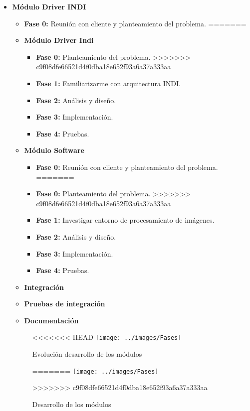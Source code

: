 \begin{itemize}
\begin{itemize}
\begin{itemize}
	\item \textbf{Módulo Driver INDI}
	\begin{itemize}
		\item \textbf{Fase 0:} Reunión con cliente y planteamiento del problema.
=======
	
	\item \textbf{Módulo Driver Indi}
	\begin{itemize}
		\item \textbf{Fase 0:} Planteamiento del problema.
>>>>>>> c9f08dfe66521d4f0dba18e652f93a6a37a333aa
		\item \textbf{Fase 1:} Familiarizarme con arquitectura INDI.
		\item \textbf{Fase 2:} Análisis y diseño.
		\item \textbf{Fase 3:} Implementación.
		\item \textbf{Fase 4:} Pruebas.
	\end{itemize}
	
	\item \textbf{Módulo Software} 
	\begin{itemize}
<<<<<<< HEAD
		\item \textbf{Fase 0:} Reunión con cliente y planteamiento del problema.
=======
		\item \textbf{Fase 0:} Planteamiento del problema.
>>>>>>> c9f08dfe66521d4f0dba18e652f93a6a37a333aa
		\item \textbf{Fase 1:} Investigar entorno de procesamiento de imágenes.
		\item \textbf{Fase 2:} Análisis y diseño.
		\item \textbf{Fase 3:} Implementación.
		\item \textbf{Fase 4:} Pruebas.
	\end{itemize}
		\item \textbf{Integración} 
		\item \textbf{Pruebas de integración}
		\item \textbf{Documentación}
\end{itemize}



\begin{figure}[h]
\centering
<<<<<<< HEAD
\texttt{[image: ../images/Fases]}
\caption{Evolución desarrollo de los módulos}
=======
\texttt{[image: ../images/Fases]}
\caption{Desarrollo de los módulos}
>>>>>>> c9f08dfe66521d4f0dba18e652f93a6a37a333aa
\label{fig:Fases}
\end{figure}



\end{itemize}
\end{itemize}
\end{itemize}
